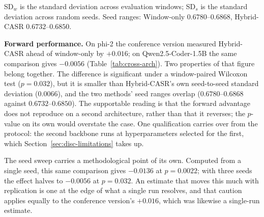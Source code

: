 \begin{table}[t]
  \centering
  \caption{Forward F1 across backbones. $\Delta$ and $p$ are paired Wilcoxon signed-rank tests against the window-only baseline \emph{on the same backbone}, over the 41 common windows, after averaging across seeds.}
  \label{tab:cross-arch}
  \vspace{1mm}
  {\footnotesize SD$_w$ is the standard deviation across evaluation windows; SD$_s$ is the standard deviation across random seeds. Seed ranges: Window-only $0.6780$--$0.6868$, Hybrid-CASR $0.6732$--$0.6850$.}
\end{table}

\textbf{Forward performance.} On phi-2 the conference version measured Hybrid-CASR ahead of window-only by $+0.016$; on Qwen2.5-Coder-1.5B the same comparison gives $-0.0056$ (Table~\ref{tab:cross-arch}). Two properties of that figure belong together. The difference is significant under a window-paired Wilcoxon test ($p=0.032$), but it is smaller than Hybrid-CASR's own seed-to-seed standard deviation ($0.0066$), and the two methods' seed ranges overlap ($0.6780$--$0.6868$ against $0.6732$--$0.6850$). The supportable reading is that the forward advantage does not reproduce on a second architecture, rather than that it reverses; the $p$-value on its own would overstate the case. One qualification carries over from the protocol: the second backbone runs at hyperparameters selected for the first, which Section~\ref{sec:disc-limitations} takes up.

The seed sweep carries a methodological point of its own. Computed from a single seed, this same comparison gives $-0.0136$ at $p=0.0022$; with three seeds the effect halves to $-0.0056$ at $p=0.032$. An estimate that moves this much with replication is one at the edge of what a single run resolves, and that caution applies equally to the conference version's $+0.016$, which was likewise a single-run estimate.

